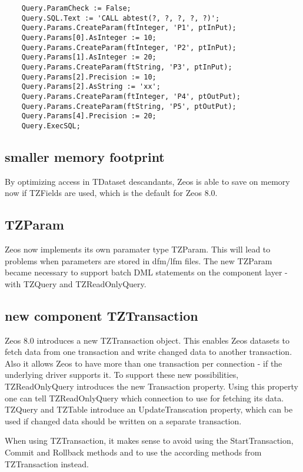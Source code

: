 \documentclass[a4paper,12pt,oneside]{report}
\begin{document}
\begin{lstlisting}
    Query.ParamCheck := False;
    Query.SQL.Text := 'CALL abtest(?, ?, ?, ?, ?)';
    Query.Params.CreateParam(ftInteger, 'P1', ptInPut);
    Query.Params[0].AsInteger := 10;
    Query.Params.CreateParam(ftInteger, 'P2', ptInPut);
    Query.Params[1].AsInteger := 20;
    Query.Params.CreateParam(ftString, 'P3', ptInPut);
    Query.Params[2].Precision := 10;
    Query.Params[2].AsString := 'xx';
    Query.Params.CreateParam(ftInteger, 'P4', ptOutPut);
    Query.Params.CreateParam(ftString, 'P5', ptOutPut);
    Query.Params[4].Precision := 20;
    Query.ExecSQL;
\end{lstlisting}

\subsection{smaller memory footprint}
By optimizing access in TDataset descandants, Zeos is able to save on memory now if TZFields are used, which is the default for Zeos 8.0.

\subsection{TZParam}


Zeos now implements its own paramater type TZParam.
This will lead to problems when parameters are stored in dfm/lfm files.
The new TZParam became necessary to support batch DML statements on the component layer - with TZQuery and TZReadOnlyQuery.

\subsection{new component TZTransaction}

Zeos 8.0 introduces a new TZTransaction object.
This enables Zeos datasets to fetch data from one transaction and write changed data to another transaction.
Also it allows Zeos to have more than one transaction per connection - if the underlying driver supports it.
To support these new possibilities, TZReadOnlyQuery introduces the new Transaction property.
Using this property one can tell TZReadOnlyQuery which connection to use for fetching its data.
TZQuery and TZTable introduce an UpdateTranscation property, which can be used if changed data should be written on a separate transaction.

When using TZTransaction, it makes sense to avoid using the StartTransaction, Commit and Rollback methods and to use the according methods from TZTransaction instead.
\end{document}
